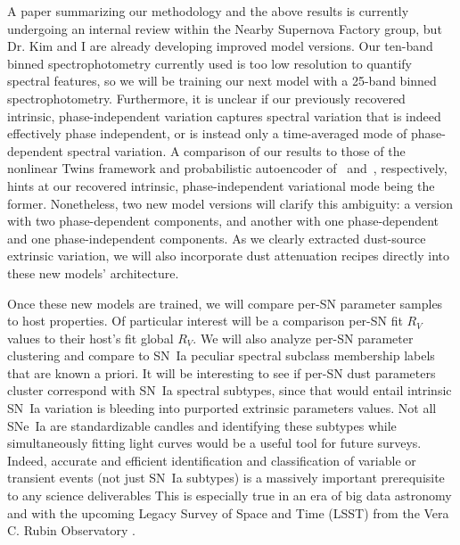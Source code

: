 \documentclass[modern]{aastex631}
\begin{document}
A paper summarizing our methodology and the above results is currently undergoing an internal review within the Nearby Supernova Factory group, but Dr. Kim and I are already developing improved model versions. 
Our ten-band binned spectrophotometry currently used is too low resolution to quantify spectral features, so we will be training our next model with a 25-band binned spectrophotometry. 
Furthermore, it is unclear if our previously recovered intrinsic, phase-independent variation captures spectral variation that is indeed effectively phase independent, or is instead only a time-averaged mode of phase-dependent spectral variation. 
A comparison of our results to those of the nonlinear Twins framework and probabilistic autoencoder of~\cite{Boone2021} and~\cite{Stein2022}, respectively, hints at our recovered intrinsic, phase-independent variational mode being the former. 
Nonetheless, two new model versions will clarify this ambiguity: a version with two phase-dependent components, and another with one phase-dependent and one phase-independent components. 
As we clearly extracted dust-source extrinsic variation, we will also incorporate dust attenuation recipes directly into these new models' architecture. 

Once these new models are trained, we will compare per-SN parameter samples to host properties. 
Of particular interest will be a comparison per-SN fit $R_V$ values to their host's fit global $R_V$. 
We will also analyze per-SN parameter clustering and compare to SN~Ia peculiar spectral subclass membership labels that are known a priori. 
It will be interesting to see if per-SN dust parameters cluster correspond with SN~Ia spectral subtypes, since that would entail intrinsic SN~Ia variation is bleeding into purported extrinsic parameters values. 
Not all SNe~Ia are standardizable candles and identifying these subtypes while simultaneously fitting light curves would be a useful tool for future surveys. 
Indeed, accurate and efficient identification and classification of variable or transient events (not just SN~Ia subtypes) is a massively important prerequisite to any science deliverables
This is especially true in an era of big data astronomy and with the upcoming Legacy Survey of Space and Time (LSST) from the Vera C. Rubin Observatory \citep{Zeljko2019}. 
\end{document}
